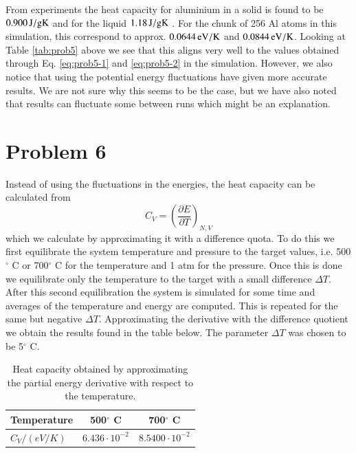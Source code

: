 From experiments the heat capacity for aluminium in a solid is found to be $\unit[0.900]{J/g K}$ \cite{al_heat_solid} and for the liquid $\unit[1.18]{J/g K}$ \cite{al_heat_liquid}. For the chunk of 256 Al atoms in this simulation, this correspond to approx. $\unit[0.0644]{eV/K}$ and $\unit[0.0844]{eV/K}$. Looking at Table \ref{tab:prob5} above we see that this aligns very well to the values obtained through Eq. \eqref{eq:prob5-1} and \eqref{eq:prob5-2} in the simulation. However, we also notice that using the potential energy fluctuations have given more accurate results. We are not sure why this seems to be the case, but we have also noted that results can fluctuate some between runs which might be an explanation.

\section*{Problem 6}

Instead of using the fluctuations in the energies, the heat capacity can be calculated from 
\begin{equation}
	C_V = \left( \frac{\partial E}{\partial T} \right)_{N,V}
\end{equation}
which we calculate by approximating it with a difference quota. To do this we first equilibrate the system temperature and pressure to the target values, i.e. 500$^\circ$ C or 700$^\circ$ C for the temperature and 1 atm for the pressure. Once this is done we equilibrate only the temperature to the target with a small difference $\Delta T$. After this second equilibration the system is simulated for some time and averages of the temperature and energy are computed. This is repeated for the same but negative $\Delta T$. Approximating the derivative with the difference quotient we obtain the results found in the table below. The parameter $\Delta T$ was chosen to be 5$^\circ$ C.

\begin{table}[h!]
	\centering	
	\caption{Heat capacity obtained by approximating the partial energy derivative with respect to the temperature.}
	\begin{tabular}{l|cc}
		\hline \textbf{Temperature} & \textbf{500$^\circ$ C} & \textbf{700$^\circ$ C} \\ \hline
		$C_V / (\unit{eV/K})$ & $6.436 \cdot 10^{-2}$ & $8.5400 \cdot 10^{-2}$ \\ \hline
	\end{tabular}
	\label{tab:prob6}
\end{table}


